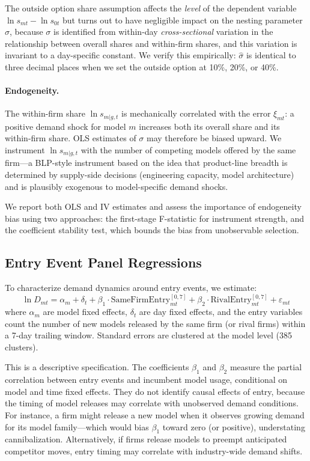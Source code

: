 \documentclass[11pt, a4paper]{article}
\begin{document}
The outside option share assumption affects the \emph{level} of the dependent variable $\ln s_{mt} - \ln s_{0t}$ but turns out to have negligible impact on the nesting parameter $\sigma$, because $\sigma$ is identified from within-day \emph{cross-sectional} variation in the relationship between overall shares and within-firm shares, and this variation is invariant to a day-specific constant. We verify this empirically: $\hat{\sigma}$ is identical to three decimal places when we set the outside option at 10\%, 20\%, or 40\%.

\paragraph{Endogeneity.} The within-firm share $\ln s_{m|g,t}$ is mechanically correlated with the error $\xi_{mt}$: a positive demand shock for model $m$ increases both its overall share and its within-firm share. OLS estimates of $\sigma$ may therefore be biased upward. We instrument $\ln s_{m|g,t}$ with the number of competing models offered by the same firm---a BLP-style instrument \citep{berry1995automobile} based on the idea that product-line breadth is determined by supply-side decisions (engineering capacity, model architecture) and is plausibly exogenous to model-specific demand shocks.

We report both OLS and IV estimates and assess the importance of endogeneity bias using two approaches: the first-stage F-statistic for instrument strength, and the \citet{oster2019unobservable} coefficient stability test, which bounds the bias from unobservable selection.

\subsection{Entry Event Panel Regressions}

To characterize demand dynamics around entry events, we estimate:
\begin{equation}
\ln D_{mt} = \alpha_m + \delta_t + \beta_1 \cdot \text{SameFirmEntry}_{mt}^{[0,7]} + \beta_2 \cdot \text{RivalEntry}_{mt}^{[0,7]} + \varepsilon_{mt}
\label{eq:panel}
\end{equation}
where $\alpha_m$ are model fixed effects, $\delta_t$ are day fixed effects, and the entry variables count the number of new models released by the same firm (or rival firms) within a 7-day trailing window. Standard errors are clustered at the model level (385 clusters).

This is a descriptive specification. The coefficients $\beta_1$ and $\beta_2$ measure the partial correlation between entry events and incumbent model usage, conditional on model and time fixed effects. They do not identify causal effects of entry, because the timing of model releases may correlate with unobserved demand conditions. For instance, a firm might release a new model when it observes growing demand for its model family---which would bias $\beta_1$ toward zero (or positive), understating cannibalization. Alternatively, if firms release models to preempt anticipated competitor moves, entry timing may correlate with industry-wide demand shifts.
\end{document}
